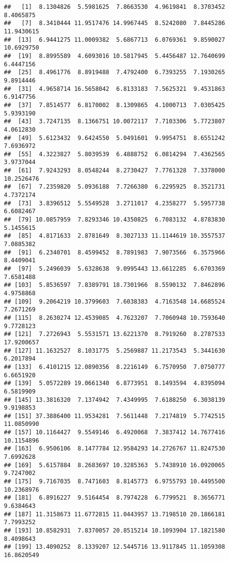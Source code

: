 \documentclass[
]{article}
\begin{document}
\begin{verbatim}
##   [1]  8.1304826  5.5981625  7.8663530  4.9619841  8.3703452  8.4065875
##   [7]  8.3410444 11.9517476 14.9967445  8.5242080  7.8445286 11.9430615
##  [13]  6.9441275 11.0009382  5.6867713  6.0769361  9.8590027 10.6929750
##  [19]  8.8995589  4.6093016 10.5817945  5.4456487 12.7640699  6.4447156
##  [25]  8.4961776  8.8919488  7.4792400  6.7393255  7.1930265  9.8914446
##  [31]  4.9658714 16.5658042  6.8133183  7.5625321  9.4531863  6.9147756
##  [37]  7.8514577  6.8170002  8.1309865  4.1000713  7.0305425  5.9393190
##  [43]  3.7247135  8.1366751 10.0072117  7.7103306  5.7723807  4.0612830
##  [49]  5.6123432  9.6424550  5.0491601  9.9954751  8.6551242  7.6936972
##  [55]  4.3223827  5.8039539  6.4888752  6.0814294  7.4362565  3.9737044
##  [61]  7.9243293  8.0548244  8.2730427  7.7761328  7.3378000 10.2526476
##  [67]  7.2359820  5.0936188  7.7266380  6.2295925  8.3521731  4.7372174
##  [73]  3.8396512  5.5549528  3.2711017  4.2358277  5.5957738  6.6082467
##  [79] 10.0857959  7.8293346 10.4350825  6.7083132  4.8783830  5.1455615
##  [85]  4.8171633  2.8781649  8.3027133 11.1144619 10.3557537  7.0885382
##  [91]  6.2340701  8.4599452  8.7891983  7.9073566  6.3575966  8.4409041
##  [97]  5.2496039  5.6328638  9.0995443 13.6612285  6.6703369  7.6581488
## [103]  5.8536597  7.8389791 18.7301966  8.5590132  7.8462896  4.9758868
## [109]  9.2064219 10.3799603  7.6038383  4.7163548 14.6685524  7.2671269
## [115]  8.2630274 12.4539085  4.7623207  7.7060948 10.7593640  9.7728123
## [121]  7.2726943  5.5531571 13.6221370  8.7919260  8.2787533 17.9200657
## [127] 11.1632527  8.1031775  5.2569887 11.2173543  5.3441630  6.2017894
## [133]  6.4101215 12.0890356  8.2216149  6.7570950  7.0750777  6.6651920
## [139]  5.0572289 19.0661340  6.8773951  8.1493594  4.8395094  6.5819909
## [145] 13.3816320  7.1374942  7.4349995  7.6188250  6.3038139  9.9198853
## [151] 37.3886400 11.9534281  7.5611448  7.2174819  5.7742515 11.0850990
## [157] 10.1164427  9.5549146  6.4920068  7.3837412 14.7677416 10.1154896
## [163]  6.9506106  8.1477784 12.9584293 14.2726767 11.8247530  7.6992628
## [169]  5.6157884  8.2683697 10.3285363  5.7438910 16.0920065  9.7247002
## [175]  9.7167035  8.7471603  8.8145773  6.9755793 10.4495500 10.2368976
## [181]  6.8916227  9.5164454  8.7974228  6.7799521  8.3656771  9.6384643
## [187] 11.3158673 11.6772815 11.0443957 13.7198510 20.1866181  7.7993252
## [193] 10.8582931  7.8370057 20.8515214 10.1093904 17.1821580  8.4098643
## [199] 13.4090252  8.1339207 12.5445716 13.9117845 11.1059308 16.8620549

\end{verbatim}
\end{document}
